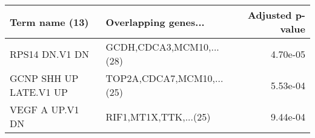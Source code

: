 \begin{tabular}{llr}
\toprule
        Term name (13) &      Overlapping genes... &  Adjusted p-value \\
\midrule
        RPS14 DN.V1 DN &  GCDH,CDCA3,MCM10,...(28) &          4.70e-05 \\
GCNP SHH UP LATE.V1 UP & TOP2A,CDCA7,MCM10,...(25) &          5.53e-04 \\
       VEGF A UP.V1 DN &     RIF1,MT1X,TTK,...(25) &          9.44e-04 \\
\bottomrule
\end{tabular}
